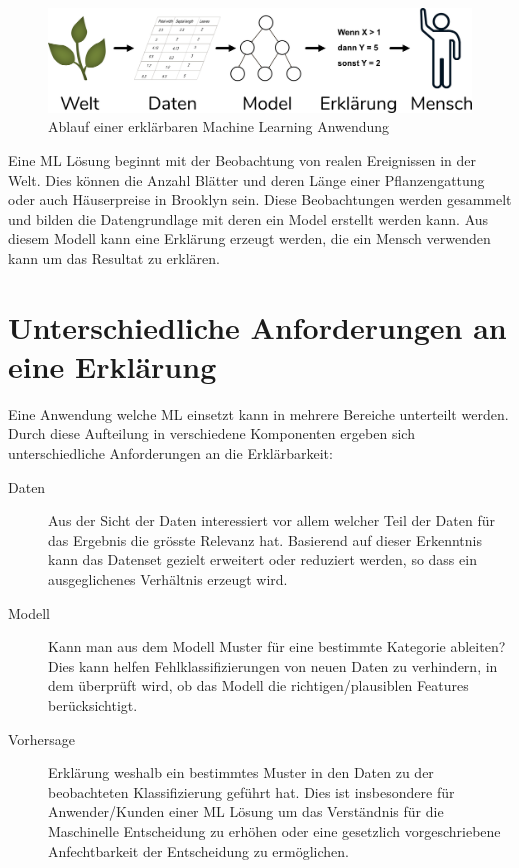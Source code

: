 \documentclass[
  12pt, %
  a4paper, %
  oneside, %
  openany, 
  numbers=noenddot, %
  BCOR=5mm, %
  parskip=half*, %
  thesis, %
]{bfhbook}
\begin{document}
\begin{figure}[ht]
\centering
\includegraphics[width=\textwidth]{Bilder/Explanation-Flow.png}
\caption{Ablauf einer erklärbaren Machine Learning Anwendung}
\end{figure}

Eine \Gls{ML} Lösung beginnt mit der Beobachtung von realen Ereignissen in der Welt. Dies können die Anzahl Blätter und deren Länge einer Pflanzengattung oder auch Häuserpreise in Brooklyn sein. Diese Beobachtungen werden gesammelt und bilden die Datengrundlage mit deren ein Model erstellt werden kann. Aus diesem Modell kann eine Erklärung erzeugt werden, die ein Mensch verwenden kann um das Resultat zu erklären.

\section{Unterschiedliche Anforderungen an eine Erklärung}
Eine Anwendung welche \Gls{ML} einsetzt kann in mehrere Bereiche unterteilt werden.  Durch diese Aufteilung in verschiedene  Komponenten ergeben sich unterschiedliche Anforderungen an die Erklärbarkeit: \parencite{XAI2018}

\begin{description}
\item[Daten]
Aus der Sicht der Daten interessiert vor allem welcher Teil der Daten für das Ergebnis die grösste Relevanz hat. Basierend auf dieser Erkenntnis kann das Datenset gezielt erweitert oder reduziert werden, so dass ein ausgeglichenes Verhältnis erzeugt wird.

\item[Modell]
Kann man aus dem Modell Muster für eine bestimmte Kategorie ableiten? Dies kann helfen Fehlklassifizierungen von neuen Daten zu verhindern, in dem überprüft wird, ob das Modell die richtigen/plausiblen Features berücksichtigt.

\item[Vorhersage]
Erklärung weshalb ein bestimmtes Muster in den Daten zu der beobachteten Klassifizierung geführt hat. Dies ist insbesondere für Anwender/Kunden einer ML Lösung um das Verständnis für die Maschinelle Entscheidung zu erhöhen oder eine gesetzlich vorgeschriebene Anfechtbarkeit der Entscheidung zu ermöglichen.
\end{description}
\end{document}
